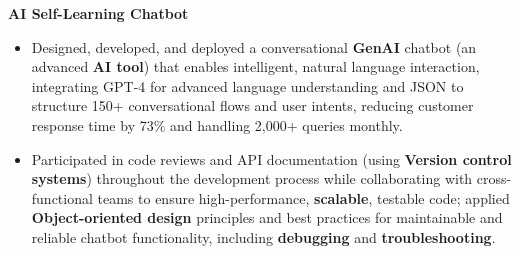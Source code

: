\documentclass[a4paper,10pt]{article}
\begin{document}
\vspace{-2mm}
\textbf{AI Self-Learning Chatbot} \\
\begin{itemize}[leftmargin=*, itemsep=0pt, parsep=1pt]
\vspace{-7mm}
    \item Designed, developed, and deployed a conversational \textbf{GenAI} chatbot (an advanced \textbf{AI tool}) that enables intelligent, natural language interaction, integrating GPT-4 for advanced language understanding and JSON to structure 150+ conversational flows and user intents, reducing customer response time by 73\% and handling 2,000+ queries monthly.
    \item Participated in code reviews and API documentation (using \textbf{Version control systems}) throughout the development process while collaborating with cross-functional teams to ensure high-performance, \textbf{scalable}, testable code; applied \textbf{Object-oriented design} principles and best practices for maintainable and reliable chatbot functionality, including \textbf{debugging} and \textbf{troubleshooting}.
\end{itemize}

\vspace{-2mm}
\end{document}
